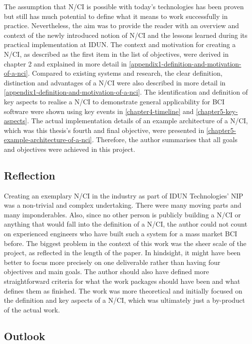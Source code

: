 The assumption that N/CI is possible with today's technologies has been proven but still has much potential to define what it means to work successfully in practice. Nevertheless, the aim was to provide the reader with an overview and context of the newly introduced notion of N/CI and the lessons learned during its practical implementation at IDUN. The context and motivation for creating a N/CI, as described as the first item in the list of objectives, were derived in chapter 2 and explained in more detail in \autoref{appendix1-definition-and-motivation-of-a-nci}. Compared to existing systems and research, the clear definition, distinction and advantages of a N/CI were also described in more detail in \autoref{appendix1-definition-and-motivation-of-a-nci}. The identification and definition of key aspects to realise a N/CI to demonstrate general applicability for BCI software were shown using key events in \autoref{chapter4-timeline} and \autoref{chapter5-key-aspects}. The actual implementation details of an example architecture of a N/CI, which was this thesis's fourth and final objective, were presented in \autoref{chapter5-example-architecture-of-a-nci}. Therefore, the author summarises that all goals and objectives were achieved in this project.

\subsection{Reflection}
\label{chapter5-reflection}

Creating an exemplary N/CI in the industry as part of IDUN Technologies' NIP was a non-trivial and complex undertaking. There were many moving parts and many imponderables. Also, since no other person is publicly building a N/CI or anything that would fall into the definition of a N/CI, the author could not count on experienced engineers who have built such a system for a mass market BCI before. The biggest problem in the context of this work was the sheer scale of the project, as reflected in the length of the paper. In hindsight, it might have been better to focus more precisely on one deliverable rather than having four objectives and main goals. The author should also have defined more straightforward criteria for what the work packages should have been and what defines them as finished. The work was more theoretical and initially  focused on the definition and key aspects of a N/CI, which was ultimately just a by-product of the actual work.

\subsection{Outlook}
\label{chapter5-outlook}

